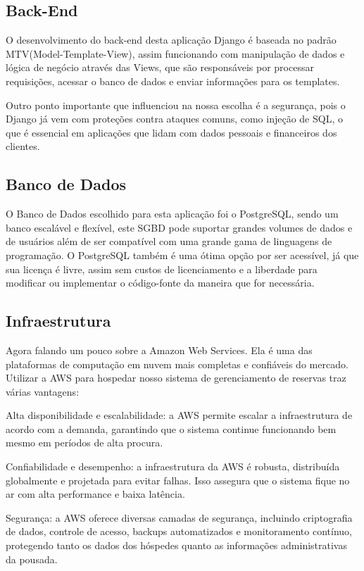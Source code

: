 \documentclass[
	12pt,				%
	openany,			%
	twoside,			%
	a4paper,			%
	english,			%
	french,				%
	spanish,			%
	brazil				%
	]{abntex2}
\begin{document}
\subsection{Back-End}
O desenvolvimento do back-end desta aplicação Django é baseada no padrão MTV(Model-Template-View), assim funcionando com manipulação de dados e lógica de negócio através das Views, que são responsáveis por processar requisições, acessar o banco de dados e enviar informações para os templates.

Outro ponto importante que influenciou na nossa escolha é a segurança, pois o Django já vem com proteções contra ataques comuns, como injeção de SQL, o que é essencial em aplicações que lidam com dados pessoais e financeiros dos clientes.
\subsection{Banco de Dados}
O Banco de Dados escolhido para esta aplicação foi o PostgreSQL, sendo um banco escalável e flexível, este SGBD pode suportar grandes volumes de dados e de usuários além de ser compatível com uma grande gama de linguagens de programação.
O PostgreSQL também é uma ótima opção por ser acessível, já que sua licença é livre, assim sem custos de licenciamento e a liberdade para modificar ou implementar o código-fonte da maneira que for necessária.
\subsection{Infraestrutura}
Agora falando um pouco sobre a Amazon Web Services. Ela é uma das plataformas de computação em nuvem mais completas e confiáveis do mercado. Utilizar a AWS para hospedar nosso sistema de gerenciamento de reservas traz várias vantagens:

Alta disponibilidade e escalabilidade: a AWS permite escalar a infraestrutura de acordo com a demanda, garantindo que o sistema continue funcionando bem mesmo em períodos de alta procura.

Confiabilidade e desempenho: a infraestrutura da AWS é robusta, distribuída globalmente e projetada para evitar falhas. Isso assegura que o sistema fique no ar com alta performance e baixa latência.

Segurança: a AWS oferece diversas camadas de segurança, incluindo criptografia de dados, controle de acesso, backups automatizados e monitoramento contínuo, protegendo tanto os dados dos hóspedes quanto as informações administrativas da pousada.
\end{document}
